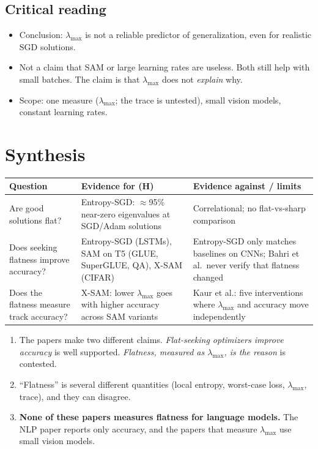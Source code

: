 \documentclass[11pt]{article}
\newcommand{\lmax}{\lambda_{\max}}
\theoremstyle{plain}
\begin{document}
\subsection{Critical reading}
\begin{itemize}
  \item Conclusion: $\lmax$ is not a reliable predictor of generalization, even for realistic SGD solutions.
  \item Not a claim that SAM or large learning rates are useless. Both still help with small batches. The claim is that $\lmax$ does not \emph{explain} why.
  \item Scope: one measure ($\lmax$; the trace is untested), small vision models, constant learning rates.
\end{itemize}

\section{Synthesis}
\label{sec:synthesis}

\begin{center}\small
\begin{tabularx}{\textwidth}{@{}p{3.8cm}LL@{}}
\toprule
\textbf{Question} & \textbf{Evidence for (H)} & \textbf{Evidence against / limits} \\
\midrule
Are good solutions flat? & Entropy-SGD: $\approx$95\% near-zero eigenvalues at SGD/Adam solutions & Correlational; no flat-vs-sharp comparison \\
\addlinespace
Does seeking flatness improve accuracy? & Entropy-SGD (LSTMs), SAM on T5 (GLUE, SuperGLUE, QA), X-SAM (CIFAR) & Entropy-SGD only matches baselines on CNNs; Bahri et al.\ never verify that flatness changed \\
\addlinespace
Does the flatness measure track accuracy? & X-SAM: lower $\lmax$ goes with higher accuracy across SAM variants & Kaur et al.: five interventions where $\lmax$ and accuracy move independently \\
\bottomrule
\end{tabularx}
\end{center}

\begin{enumerate}
  \item The papers make two different claims. \emph{Flat-seeking optimizers improve accuracy} is well supported.
        \emph{Flatness, measured as $\lmax$, is the reason} is contested.
  \item ``Flatness'' is several different quantities (local entropy, worst-case loss, $\lmax$, trace), and they can disagree.
  \item \textbf{None of these papers measures flatness for language models.} The NLP paper reports only accuracy, and the papers that measure $\lmax$ use small vision models.
\end{enumerate}
\end{document}
